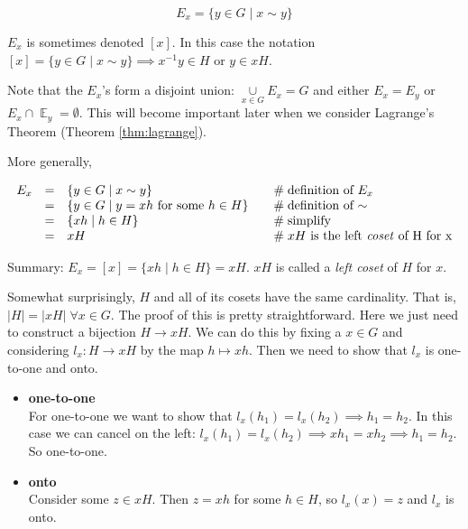 \documentclass[11pt, oneside]{article}   	%
\theoremstyle{definition}
\DeclareMathOperator{\E}{\mathbb{E}}
\begin{document}
\bigskip
\begin{equation*}
E_x = \{y \in G \mid x \sim y \}
\end{equation*}

\bigskip
\noindent
$E_x$ is sometimes denoted $[x]$.  In this case the notation $[x] = \{y \in G \mid x \sim y\} \implies x^{-1}y \in H$ or $y \in xH$.

\bigskip
\noindent
Note that the $E_x$'s form a disjoint union: $\underset{x \in G}{\cup}  E_x = G$ and either $E_x = E_y$ or $E_x \cap \E_y = \emptyset$. This
will become important later when we consider Lagrange's Theorem (Theorem \ref{thm:lagrange}).


\bigskip
\noindent
More generally, 

\begin{equation*}
\begin{array}{rcll}
E_x
&=& \{y \in G \mid x \sim y\}                                               &\quad  \mathrel{\#} \text{definition of $E_x$}   \\
&=& \{y \in G \mid y = xh \text{ for some } h \in H\}            &\quad  \mathrel{\#} \text{definition of $\sim$}  \\
&=& \{xh \mid h \in H\}                                                        &\quad  \mathrel{\#} \text{simplify}                    \\
&=& xH                                                                               &\quad  \mathrel{\#} xH \text{ is the left \emph{coset} of H for x}                    \\
\end{array}
\end{equation*}

\bigskip
\noindent
Summary: $E_x = [x] = \{xh \mid h \in H\} = xH$. $xH$ is called a \emph{left coset} of $H$ for $x$.

\bigskip
\noindent
Somewhat surprisingly, $H$ and all of its cosets have the same cardinality. That is,  $|H| = |xH|\;  \forall x \in G$.  The proof
of this is pretty straightforward. Here we just need to construct a bijection $H \rightarrow xH$. We can do this by fixing a $x \in G$ and considering 
$l_x: H \rightarrow xH$ by the map $h \mapsto xh$. Then we need to show that $l_x$ is one-to-one and onto.

\begin{itemize}
\item \textbf{one-to-one} \\
For one-to-one we want to show that  $l_x(h_1) = l_x(h_2) \implies h_1 = h_2$. In this case we can cancel on the left: 
$l_x(h_1) = l_x(h_2) \implies xh_1 = xh_2 \implies h_1 = h_2$.
So one-to-one.
\item \textbf{onto} \\
Consider some $z \in xH$. Then $z = xh$ for some $h \in H$, so $l_x(x) = z$ and $l_x$ is onto.
\end{itemize}
\end{document}
